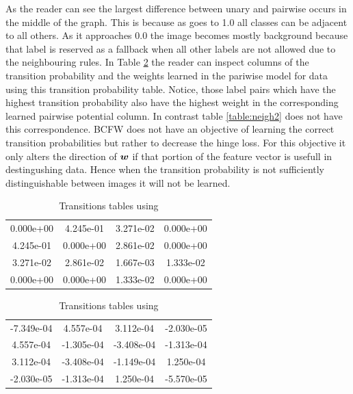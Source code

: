 As the reader can see the largest difference between unary and pairwise occurs in the middle of the graph. This is because as  goes to 1.0 all classes can be adjacent to all others. As it approaches 0.0 the image becomes mostly background because that label is reserved as a fallback when all other labels are not allowed due to the neighbouring rules. In Table \ref{table:neigh1} the reader can inspect columns of the transition probability and the weights learned in the pariwise model for data using this transition probability table. Notice, those label pairs which have the highest transition probability also have the highest weight in the corresponding learned pairwise potential column. In contrast table \ref{table:neigh2} does not have this correspondence. BCFW does not have an objective of learning the correct transition probabilities but rather to decrease the hinge loss. For this objective it only alters the direction of $\bm{w}$ if that portion of the feature vector is usefull in destingushing data. Hence when the transition probability is not sufficiently distinguishable between images it will not be learned. 
\begin{table}
\caption{Transitions tables using  }
\label{table:neigh1}
\centering
\begin{tabular}{ c c c c}
	0.000e+00 &	4.245e-01 & 3.271e-02 &	0.000e+00 \\
	4.245e-01 &	0.000e+00 &	2.861e-02 &	0.000e+00 \\
	3.271e-02 &	2.861e-02 &	1.667e-03 &	1.333e-02 \\
	0.000e+00 &	0.000e+00 &	1.333e-02 &	0.000e+00 \\
\end{tabular}
\bigskip
{}
\begin{tabular}{ c c c c}
  -7.349e-04 & 4.557e-04 & 3.112e-04 & -2.030e-05 \\
  4.557e-04 & -1.305e-04 & -3.408e-04 & -1.313e-04 \\
  3.112e-04 & -3.408e-04 & -1.149e-04 & 1.250e-04 \\
  -2.030e-05 & -1.313e-04 & 1.250e-04 & -5.570e-05 \\
\end{tabular}
\end{table}

